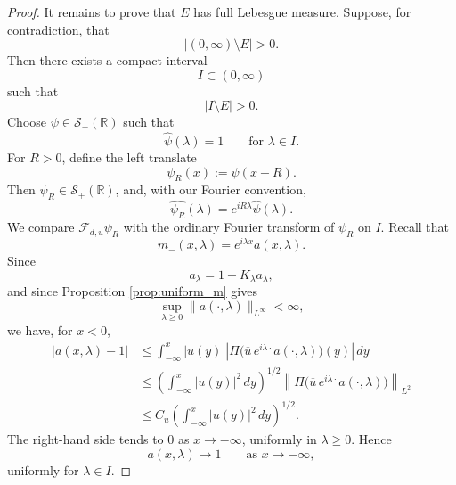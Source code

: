 \documentclass[10pt]{article}
\numberwithin{equation}{section}
\numberwithin{theorem}{section}
\begin{document}
\begin{proof}
It remains to prove that \(E\) has full Lebesgue measure. Suppose, for contradiction, that
\[
|(0,\infty)\setminus E|>0.
\]
Then there exists a compact interval
\[
I\subset(0,\infty)
\]
such that
\begin{equation}
\label{2.15.4}
|I\setminus E|>0.
\end{equation}
Choose \(\psi\in\mathcal S_+(\mathbb R)\) such that
\begin{equation}
\label{2.15.5}
\widehat\psi(\lambda)=1
\qquad\text{for }\lambda\in I.
\end{equation}
For \(R>0\), define the left translate
\[
\psi_R(x):=\psi(x+R).
\]
Then \(\psi_R\in\mathcal S_+(\mathbb R)\), and, with our Fourier convention,
\begin{equation}
\label{2.15.6}
\widehat{\psi_R}(\lambda)=e^{iR\lambda}\widehat\psi(\lambda).
\end{equation}
We compare \(\mathcal F_{d,u}\psi_R\) with the ordinary Fourier transform of \(\psi_R\) on
\(I\). Recall that
\[
m_-(x,\lambda)=e^{i\lambda x}a(x,\lambda).
\]
Since
\[
a_\lambda=1+K_\lambda a_\lambda,
\]
and since Proposition \ref{prop:uniform_m} gives
\[
\sup_{\lambda\ge0}\|a(\cdot,\lambda)\|_{L^\infty}<\infty,
\]
we have, for \(x<0\),
\begin{equation}
\label{2.15.7}
\begin{aligned}
|a(x,\lambda)-1|
&\le
\int_{-\infty}^x
|u(y)|
\left|
\Pi\bigl(\overline u\,e^{i\lambda\cdot}a(\cdot,\lambda)\bigr)(y)
\right|\,dy  \\
&\le
\left(\int_{-\infty}^x |u(y)|^2\,dy\right)^{1/2}
\left\|
\Pi\bigl(\overline u\,e^{i\lambda\cdot}a(\cdot,\lambda)\bigr)
\right\|_{L^2}  \\
&\le
C_u
\left(\int_{-\infty}^x |u(y)|^2\,dy\right)^{1/2}.
\end{aligned}
\end{equation}
The right-hand side tends to \(0\) as \(x\to-\infty\), uniformly in \(\lambda\ge0\).
Hence
\[
a(x,\lambda)\to1
\qquad\text{as }x\to-\infty,
\]
uniformly for \(\lambda\in I\).


\end{proof}
\end{document}
